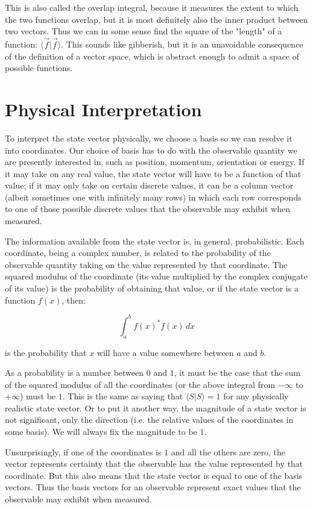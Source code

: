 This is also called the overlap integral, because it measures the extent to which the two functions overlap, but it is most definitely also the inner product between two vectors. Thus we can in some sense find the square of the "length" of a function: $\langle \vec{f} | \vec{f} \rangle$. This sounds like gibberish, but it is an unavoidable consequence of the definition of a vector space, which is abstract enough to admit a space of possible functions.

\section{Physical Interpretation}

To interpret the state vector physically, we choose a basis so we can resolve it into coordinates. Our choice of basis has to do with the observable quantity we are presently interested in, such as position, momentum, orientation or energy. If it may take on any real value, the state vector will have to be a function of that value; if it may only take on certain discrete values, it can be a column vector (albeit sometimes one with infinitely many rows) in which each row corresponds to one of those possible discrete values that the observable may exhibit when measured.

The information available from the state vector is, in general, probabilistic. Each coordinate, being a complex number, is related to the probability of the observable quantity taking on the value represented by that coordinate. The squared modulus of the coordinate (its value multiplied by the complex conjugate of its value) is the probability of obtaining that value, or if the state vector is a function $f(x)$, then:

$$\int_{a}^{b} f(x)^* f(x) \, dx$$

is the probability that $x$ will have a value somewhere between $a$ and $b$.

As a probability is a number between $0$ and $1$, it must be the case that the sum of the squared modulus of all the coordinates (or the above integral from $-\infty$ to $+\infty$) must be $1$. This is the same as saying that $\langle S | S \rangle = 1$ for any physically realistic state vector. Or to put it another way, the magnitude of a state vector is not significant, only the direction (i.e. the relative values of the coordinates in some basis). We will always fix the magnitude to be $1$.

Unsurprisingly, if one of the coordinates is $1$ and all the others are zero, the vector represents certainty that the observable has the value represented by that coordinate. But this also means that the state vector is equal to one of the basis vectors. Thus the basis vectors for an observable represent exact values that the observable may exhibit when measured.

